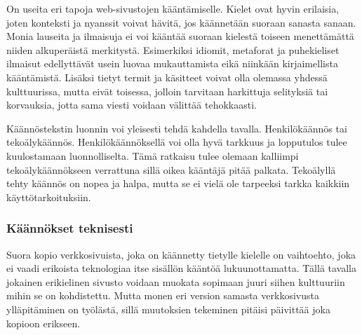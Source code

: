 \documentclass[11pt,a4paper,titlepage,oneside]{article}
\begin{document}





On useita eri tapoja web-sivustojen kääntämiselle.
Kielet ovat hyvin erilaisia, joten konteksti ja nyanssit voivat hävitä, jos käännetään suoraan sanasta sanaan.
Monia lauseita ja ilmaisuja ei voi kääntää suoraan kielestä toiseen menettämättä niiden alkuperäistä merkitystä.
Esimerkiksi idiomit, metaforat ja puhekieliset ilmaisut edellyttävät usein luovaa mukauttamista eikä niinkään kirjaimellista kääntämistä. 
Lisäksi tietyt termit ja käsitteet voivat olla olemassa yhdessä kulttuurissa, 
mutta eivät toisessa, jolloin tarvitaan harkittuja selityksiä tai korvauksia, jotta sama viesti voidaan välittää tehokkaasti.
\medskip



Käännöstekstin luonnin voi yleisesti tehdä kahdella tavalla. Henkilökäännös tai tekoälykäännös.
Henkilökäännöksellä voi olla hyvä tarkkuus ja lopputulos tulee kuulostamaan luonnolliselta.
Tämä ratkaisu tulee olemaan kalliimpi tekoälykäännökseen verrattuna sillä oikea kääntäjä pitää palkata.
Tekoälyllä tehty käännös on nopea ja halpa, mutta se ei vielä ole tarpeeksi tarkka kaikkiin käyttötarkoituksiin.
\medskip









\subsubsection{Käännökset teknisesti}








Suora kopio verkkosivuista, joka on käännetty tietylle kielelle
on vaihtoehto, joka ei vaadi erikoista teknologiaa itse sisällön kääntöä lukuunottamatta.
Tällä tavalla jokainen erikielinen sivusto voidaan muokata sopimaan juuri siihen kulttuuriin mihin se on kohdistettu.
Mutta monen eri version samasta verkkosivusta ylläpitäminen on työlästä, sillä muutoksien tekeminen pitäisi päivittää joka kopioon erikseen.
\medskip
\end{document}
